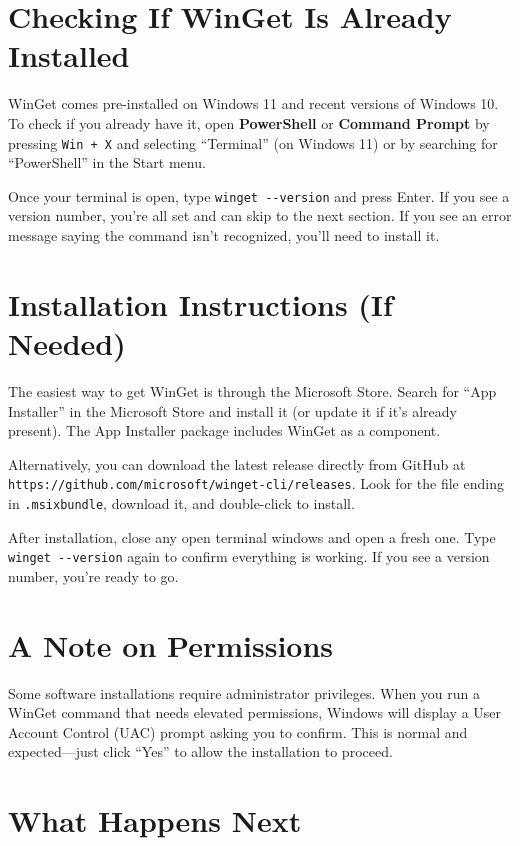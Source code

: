 \documentclass[
  letterpaper,
  DIV=11,
  numbers=noendperiod]{scrreprt}
\begin{document}
\section{Checking If WinGet Is Already
Installed}\label{checking-if-winget-is-already-installed}

WinGet comes pre-installed on Windows 11 and recent versions of Windows
10. To check if you already have it, open \textbf{PowerShell} or
\textbf{Command Prompt} by pressing \texttt{Win\ +\ X} and selecting
``Terminal'' (on Windows 11) or by searching for ``PowerShell'' in the
Start menu.

Once your terminal is open, type \texttt{winget\ -\/-version} and press
Enter. If you see a version number, you're all set and can skip to the
next section. If you see an error message saying the command isn't
recognized, you'll need to install it.

\section{Installation Instructions (If
Needed)}\label{installation-instructions-if-needed}

The easiest way to get WinGet is through the Microsoft Store. Search for
``App Installer'' in the Microsoft Store and install it (or update it if
it's already present). The App Installer package includes WinGet as a
component.

Alternatively, you can download the latest release directly from GitHub
at \texttt{https://github.com/microsoft/winget-cli/releases}. Look for
the file ending in \texttt{.msixbundle}, download it, and double-click
to install.

After installation, close any open terminal windows and open a fresh
one. Type \texttt{winget\ -\/-version} again to confirm everything is
working. If you see a version number, you're ready to go.

\section{A Note on Permissions}\label{a-note-on-permissions}

Some software installations require administrator privileges. When you
run a WinGet command that needs elevated permissions, Windows will
display a User Account Control (UAC) prompt asking you to confirm. This
is normal and expected---just click ``Yes'' to allow the installation to
proceed.

\section{What Happens Next}\label{what-happens-next-1}
\end{document}
